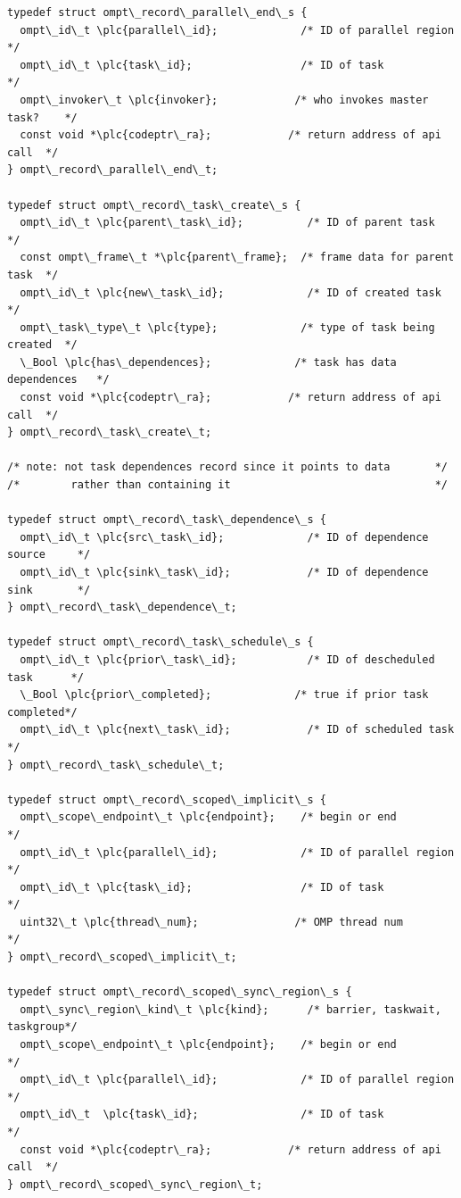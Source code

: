 \documentclass{article}
\begin{document}
\begin{boxedcode}
\begin{verbatim}
typedef struct ompt\_record\_parallel\_end\_s {
  ompt\_id\_t \plc{parallel\_id};             /* ID of parallel region       */
  ompt\_id\_t \plc{task\_id};                 /* ID of task                  */
  ompt\_invoker\_t \plc{invoker};            /* who invokes master task?    */
  const void *\plc{codeptr\_ra};            /* return address of api call  */ 
} ompt\_record\_parallel\_end\_t;

typedef struct ompt\_record\_task\_create\_s {
  ompt\_id\_t \plc{parent\_task\_id};          /* ID of parent task           */
  const ompt\_frame\_t *\plc{parent\_frame};  /* frame data for parent task  */
  ompt\_id\_t \plc{new\_task\_id};             /* ID of created task          */
  ompt\_task\_type\_t \plc{type};             /* type of task being created  */ 
  \_Bool \plc{has\_dependences};             /* task has data dependences   */
  const void *\plc{codeptr\_ra};            /* return address of api call  */ 
} ompt\_record\_task\_create\_t;

/* note: not task dependences record since it points to data       */
/*        rather than containing it                                */

typedef struct ompt\_record\_task\_dependence\_s {
  ompt\_id\_t \plc{src\_task\_id};             /* ID of dependence source     */
  ompt\_id\_t \plc{sink\_task\_id};            /* ID of dependence sink       */
} ompt\_record\_task\_dependence\_t;

typedef struct ompt\_record\_task\_schedule\_s {
  ompt\_id\_t \plc{prior\_task\_id};           /* ID of descheduled task      */
  \_Bool \plc{prior\_completed};             /* true if prior task completed*/
  ompt\_id\_t \plc{next\_task\_id};            /* ID of scheduled task        */
} ompt\_record\_task\_schedule\_t;

typedef struct ompt\_record\_scoped\_implicit\_s {
  ompt\_scope\_endpoint\_t \plc{endpoint};    /* begin or end                */
  ompt\_id\_t \plc{parallel\_id};             /* ID of parallel region       */
  ompt\_id\_t \plc{task\_id};                 /* ID of task                  */
  uint32\_t \plc{thread\_num};               /* OMP thread num              */
} ompt\_record\_scoped\_implicit\_t;

typedef struct ompt\_record\_scoped\_sync\_region\_s {
  ompt\_sync\_region\_kind\_t \plc{kind};      /* barrier, taskwait, taskgroup*/
  ompt\_scope\_endpoint\_t \plc{endpoint};    /* begin or end                */ 
  ompt\_id\_t \plc{parallel\_id};             /* ID of parallel region       */
  ompt\_id\_t  \plc{task\_id};                /* ID of task                  */
  const void *\plc{codeptr\_ra};            /* return address of api call  */
} ompt\_record\_scoped\_sync\_region\_t;


\end{verbatim}
\end{boxedcode}
\end{document}
